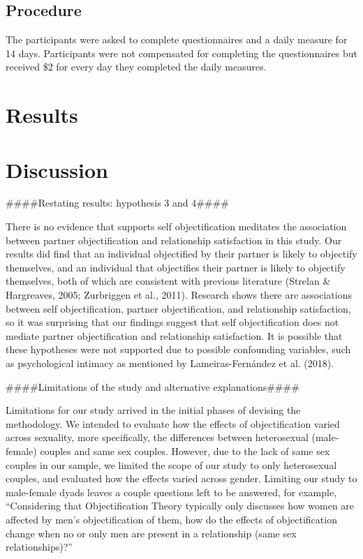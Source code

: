 \documentclass[
  man]{apa6}
\begin{document}
\hypertarget{procedure}{%
\subsection{Procedure}\label{procedure}}

The participants were asked to complete questionnaires and a daily measure for 14 days. Participants were not compensated for completing the questionnaires but received \$2 for every day they completed the daily measures.

\hypertarget{results}{%
\section{Results}\label{results}}

\hypertarget{discussion}{%
\section{Discussion}\label{discussion}}

\#\#\#\#Restating results: hypothesis 3 and 4\#\#\#\#

There is no evidence that supports self objectification meditates the association between partner objectification and relationship satisfaction in this study. Our results did find that an individual objectified by their partner is likely to objectify themselves, and an individual that objectifies their partner is likely to objectify themselves, both of which are consistent with previous literature (Strelan \& Hargreaves, 2005; Zurbriggen et al., 2011). Research shows there are associations between self objectification, partner objectification, and relationship satisfaction, so it was surprising that our findings suggest that self objectification does not mediate partner objectification and relationship satisfaction. It is possible that these hypotheses were not supported due to possible confounding variables, such as psychological intimacy as mentioned by Lameiras-Fernández et al. (2018).

\#\#\#\#Limitations of the study and alternative explanations\#\#\#\#

Limitations for our study arrived in the initial phases of devising the methodology. We intended to evaluate how the effects of objectification varied across sexuality, more specifically, the differences between heterosexual (male-female) couples and same sex couples. However, due to the lack of same sex couples in our sample, we limited the scope of our study to only heterosexual couples, and evaluated how the effects varied across gender. Limiting our study to male-female dyads leaves a couple questions left to be answered, for example, ``Considering that Objectification Theory typically only discusses how women are affected by men's objectification of them, how do the effects of objectification change when no or only men are present in a relationship (same sex relationships)?''
\end{document}
